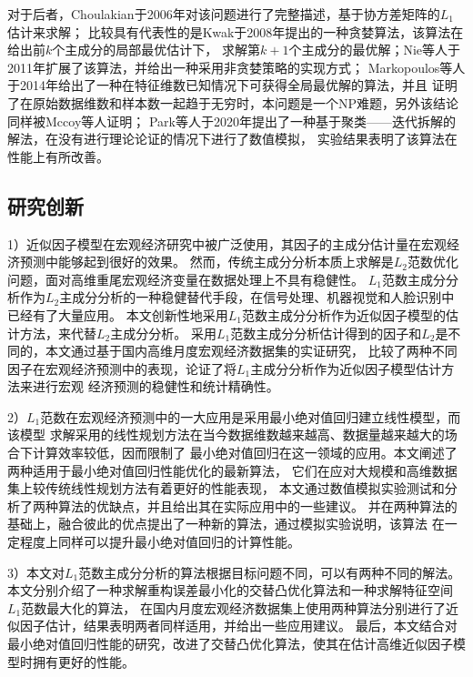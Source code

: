 对于后者，Choulakian于2006年对该问题进行了完整描述\cite{choulakian2006l1}，基于协方差矩阵的$L_1$估计\cite{galpin1987methods}来求解；
比较具有代表性的是Kwak于2008年提出的一种贪婪算法\cite{kwak2008principal}，该算法在给出前$k$个主成分的局部最优估计下，
求解第$k+1$个主成分的最优解；Nie等人于2011年扩展了该算法，并给出一种采用非贪婪策略的实现方式\cite{nie2011robust}；
Markopoulos等人于2014年给出了一种在特征维数已知情况下可获得全局最优解的算法\cite{markopoulos2014optimal}，并且
证明了在原始数据维数和样本数一起趋于无穷时，本问题是一个NP难题，另外该结论同样被Mccoy\cite{mccoy2010two}等人证明；
Park等人于2020年提出了一种基于聚类——迭代拆解的解法\cite{park2021optimization}，在没有进行理论论证的情况下进行了数值模拟，
实验结果表明了该算法在性能上有所改善。

\subsection{研究创新}

1）近似因子模型在宏观经济研究中被广泛使用，其因子的主成分估计量在宏观经济预测中能够起到很好的效果。
然而，传统主成分分析本质上求解是$L_2$范数优化问题，面对高维重尾宏观经济变量在数据处理上不具有稳健性。
$L_1$范数主成分分析作为$L_2$主成分分析的一种稳健替代手段，在信号处理、机器视觉和人脸识别中
已经有了大量应用。
本文创新性地采用$L_1$范数主成分分析作为近似因子模型的估计方法，来代替$L_2$主成分分析。
采用$L_1$范数主成分分析估计得到的因子和$L_2$是不同的，本文通过基于国内高维月度宏观经济数据集的实证研究，
比较了两种不同因子在宏观经济预测中的表现，论证了将$L_1$主成分分析作为近似因子模型估计方法来进行宏观
经济预测的稳健性和统计精确性。

2）$L_1$范数在宏观经济预测中的一大应用是采用最小绝对值回归建立线性模型，而该模型
求解采用的线性规划方法在当今数据维数越来越高、数据量越来越大的场合下计算效率较低，因而限制了
最小绝对值回归在这一领域的应用。本文阐述了两种适用于最小绝对值回归性能优化的最新算法，
它们在应对大规模和高维数据集上较传统线性规划方法有着更好的性能表现，
本文通过数值模拟实验测试和分析了两种算法的优缺点，并且给出其在实际应用中的一些建议。
并在两种算法的基础上，融合彼此的优点提出了一种新的算法，通过模拟实验说明，该算法
在一定程度上同样可以提升最小绝对值回归的计算性能。

3）本文对$L_1$范数主成分分析的算法根据目标问题不同，可以有两种不同的解法。
本文分别介绍了一种求解重构误差最小化的交替凸优化算法和一种求解特征空间$L_1$范数最大化的算法，
在国内月度宏观经济数据集上使用两种算法分别进行了近似因子估计，结果表明两者同样适用，并给出一些应用建议。
最后，本文结合对最小绝对值回归性能的研究，改进了交替凸优化算法，使其在估计高维近似因子模型时拥有更好的性能。

